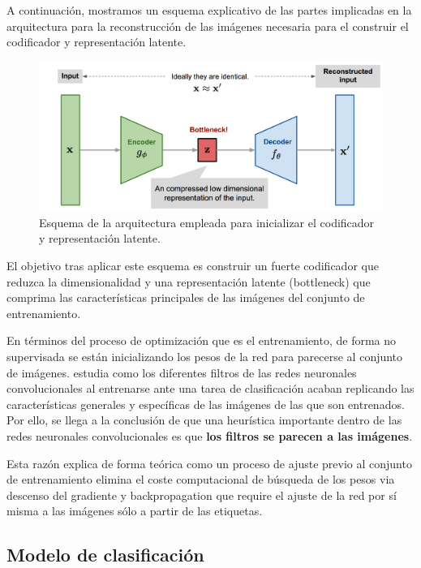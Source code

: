 A continuación, mostramos un esquema explicativo de las partes implicadas en la arquitectura para la reconstrucción de las imágenes necesaria para el construir el codificador y representación latente.

\begin{figure}[H]
	\centering
	\includegraphics[width=1.0\linewidth]{imagenes/esquema_codificador.png}
	\caption{Esquema de la arquitectura empleada para inicializar el codificador y representación latente. \cite{subedi2022retracted}}
\end{figure}


El objetivo tras aplicar este esquema es construir un fuerte codificador que reduzca la dimensionalidad y una representación latente (bottleneck) que comprima las características principales de las imágenes del conjunto de entrenamiento.

En términos del proceso de optimización que es el entrenamiento, de forma no supervisada se están inicializando los pesos de la red para parecerse al conjunto de imágenes. \cite{zeiler2014visualizing} estudia como los diferentes filtros de las redes neuronales convolucionales al entrenarse ante una tarea de clasificación acaban replicando las características generales y específicas de las imágenes de las que son entrenados. Por ello, se llega a la conclusión de que una heurística importante dentro de las redes neuronales convolucionales es que \textbf{los filtros se parecen a las imágenes}. 

Esta razón explica de forma teórica como un proceso de ajuste previo al conjunto de entrenamiento elimina el coste computacional de búsqueda de los pesos via descenso del gradiente y backpropagation que require el ajuste de la red por sí misma a las imágenes sólo a partir de las etiquetas.

\subsection{Modelo de clasificación}

